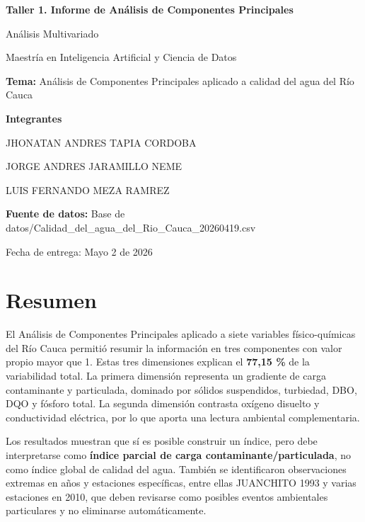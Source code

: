 \documentclass[12pt,letterpaper]{article}
\begin{document}
\begin{titlepage}
  \centering
  {\Large \textbf{Taller 1. Informe de Análisis de Componentes Principales}\par}
  \vspace{1.5cm}
  {\large Análisis Multivariado\par}
  \vspace{0.4cm}
  {\large Maestría en Inteligencia Artificial y Ciencia de Datos\par}
  \vspace{1.2cm}
  {\large \textbf{Tema:} Análisis de Componentes Principales aplicado a calidad del agua del Río Cauca\par}
  \vspace{0.4cm}
  {\large \textbf{Integrantes}\par}
  \vspace{0.2cm}
  {\large JHONATAN ANDRES TAPIA CORDOBA\par}
  {\large JORGE ANDRES JARAMILLO NEME\par}
  {\large LUIS FERNANDO MEZA RAMREZ\par}
  \vspace{0.6cm}
  {\large \textbf{Fuente de datos:} Base de datos/Calidad\_del\_agua\_del\_Rio\_Cauca\_20260419.csv\par}
  \vfill
  {\large Fecha de entrega: Mayo 2 de 2026\par}
\end{titlepage}

\tableofcontents
\newpage

\section*{Resumen}

El Análisis de Componentes Principales aplicado a siete variables físico-químicas del Río Cauca permitió resumir la información en tres componentes con valor propio mayor que 1. Estas tres dimensiones explican el \textbf{77,15 \%} de la variabilidad total. La primera dimensión representa un gradiente de carga contaminante y particulada, dominado por sólidos suspendidos, turbiedad, DBO, DQO y fósforo total. La segunda dimensión contrasta oxígeno disuelto y conductividad eléctrica, por lo que aporta una lectura ambiental complementaria.

Los resultados muestran que sí es posible construir un índice, pero debe interpretarse como \textbf{índice parcial de carga contaminante/particulada}, no como índice global de calidad del agua. También se identificaron observaciones extremas en años y estaciones específicas, entre ellas JUANCHITO 1993 y varias estaciones en 2010, que deben revisarse como posibles eventos ambientales particulares y no eliminarse automáticamente.
\end{document}
